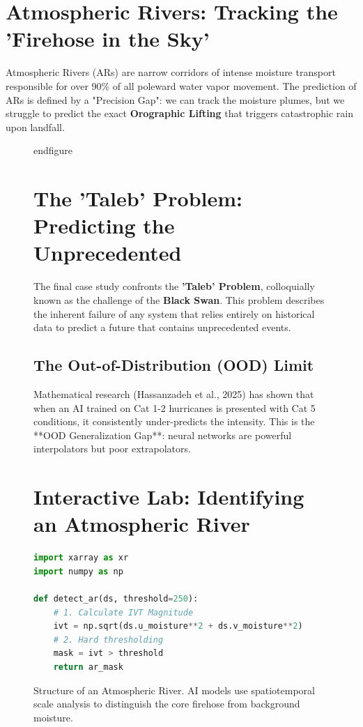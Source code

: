 \section{Atmospheric Rivers: Tracking the 'Firehose in the Sky'}

Atmospheric Rivers (ARs) are narrow corridors of intense moisture transport responsible for over 90\% of all poleward water vapor movement. The prediction of ARs is defined by a "Precision Gap": we can track the moisture plumes, but we struggle to predict the exact \textbf{Orographic Lifting} that triggers catastrophic rain upon landfall.

\begin{figure}[H]
    \centering
    \caption{Structure of an Atmospheric River. AI models use spatiotemporal scale analysis to distinguish the core firehose from background moisture.}
    \label{fig:atmospheric_river}
end{figure}

\section{The 'Taleb' Problem: Predicting the Unprecedented}

The final case study confronts the \textbf{'Taleb' Problem}, colloquially known as the challenge of the \textbf{Black Swan}. This problem describes the inherent failure of any system that relies entirely on historical data to predict a future that contains unprecedented events.

\subsection{The Out-of-Distribution (OOD) Limit}
Mathematical research (Hassanzadeh et al., 2025) has shown that when an AI trained on Cat 1-2 hurricanes is presented with Cat 5 conditions, it consistently under-predicts the intensity. This is the **OOD Generalization Gap**: neural networks are powerful interpolators but poor extrapolators. 

\section{Interactive Lab: Identifying an Atmospheric River}

\begin{lstlisting}[language=Python, caption=Python Implementation of IVT-based AR Detection]
import xarray as xr
import numpy as np

def detect_ar(ds, threshold=250):
    # 1. Calculate IVT Magnitude
    ivt = np.sqrt(ds.u_moisture**2 + ds.v_moisture**2)
    # 2. Hard thresholding
    mask = ivt > threshold
    return ar_mask
\end{lstlisting}


\end{figure}
